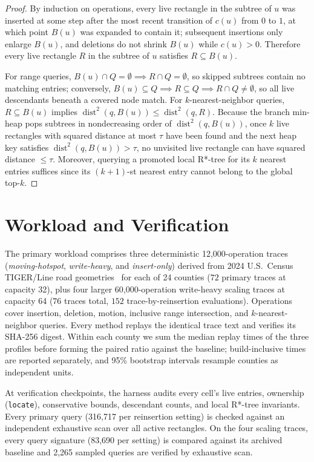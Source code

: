 \documentclass[10pt,letterpaper]{article}
\begin{document}
\begin{proof}
By induction on operations, every live rectangle in the subtree of $u$ was inserted at some step after the most recent transition of $c(u)$ from $0$ to $1$, at which point $B(u)$ was expanded to contain it; subsequent insertions only enlarge $B(u)$, and deletions do not shrink $B(u)$ while $c(u) > 0$. Therefore every live rectangle $R$ in the subtree of $u$ satisfies $R \subseteq B(u)$.

For range queries, $B(u) \cap Q = \emptyset \implies R \cap Q = \emptyset$, so skipped subtrees contain no matching entries; conversely, $B(u) \subseteq Q \implies R \subseteq Q \implies R \cap Q \neq \emptyset$, so all live descendants beneath a covered node match. For $k$-nearest-neighbor queries, $R \subseteq B(u)$ implies $\operatorname{dist}^2(q, B(u)) \leq \operatorname{dist}^2(q, R)$. Because the branch min-heap pops subtrees in nondecreasing order of $\operatorname{dist}^2(q, B(u))$, once $k$ live rectangles with squared distance at most $\tau$ have been found and the next heap key satisfies $\operatorname{dist}^2(q, B(u)) > \tau$, no unvisited live rectangle can have squared distance $\leq \tau$. Moreover, querying a promoted local R*-tree for its $k$ nearest entries suffices since its $(k+1)$-st nearest entry cannot belong to the global top-$k$.
\end{proof}

\section{Workload and Verification}

The primary workload comprises three deterministic 12,000-operation traces (\emph{moving-hotspot}, \emph{write-heavy}, and \emph{insert-only}) derived from 2024 U.S.\ Census TIGER/Line road geometries~\cite{census2024} for each of 24 counties ($72$ primary traces at capacity 32), plus four larger 60,000-operation write-heavy scaling traces at capacity 64 ($76$ traces total, $152$ trace-by-reinsertion evaluations). Operations cover insertion, deletion, motion, inclusive range intersection, and $k$-nearest-neighbor queries. Every method replays the identical trace text and verifies its SHA-256 digest. Within each county we sum the median replay times of the three profiles before forming the paired ratio against the baseline; build-inclusive times are reported separately, and 95\% bootstrap intervals resample counties as independent units.

At verification checkpoints, the harness audits every cell's live entries, ownership (\texttt{locate}), conservative bounds, descendant counts, and local R*-tree invariants. Every primary query (316,717 per reinsertion setting) is checked against an independent exhaustive scan over all active rectangles. On the four scaling traces, every query signature (83,690 per setting) is compared against its archived baseline and 2,265 sampled queries are verified by exhaustive scan.
\end{document}

